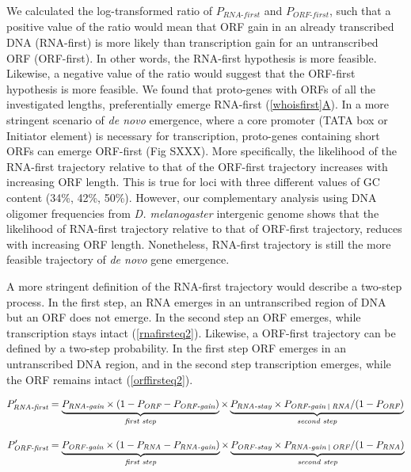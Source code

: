 \documentclass[12pt,a4paper]{article}
\newcommand{\cmnt}[1]{{\color{purple} #1}}
\begin{document}
\cmnt{We calculated the log-transformed ratio of $P_\textit{RNA-first}$ and $P_\textit{ORF-first}$, such that a positive value of the ratio would mean that ORF gain in an already transcribed DNA (RNA-first) is more likely than transcription gain for an untranscribed ORF (ORF-first). In other words, the RNA-first hypothesis is more feasible. Likewise, a negative value of the ratio would suggest that the ORF-first hypothesis is more feasible. We found that proto-genes with ORFs of all the investigated lengths, preferentially emerge RNA-first (\hyperref[whoisfirst]{\autoref{whoisfirst}A}). In a more stringent scenario of \textit{de novo} emergence, where a core promoter (TATA box or Initiator element) is necessary for transcription, proto-genes containing short ORFs can emerge ORF-first (Fig SXXX). More specifically, the likelihood of the RNA-first trajectory relative to that of the ORF-first trajectory  increases with increasing ORF length. This is true for loci with three different values of GC content (34\%, 42\%, 50\%). However, our complementary analysis using DNA oligomer frequencies from \textit{D. melanogaster} intergenic genome shows that the likelihood of RNA-first trajectory relative to that of ORF-first trajectory, reduces with increasing ORF length. Nonetheless, RNA-first trajectory is still the more feasible trajectory of \textit{de novo} gene emergence.} 

A more stringent definition of the RNA-first trajectory would describe a two-step process. In the first step, an RNA emerges in an untranscribed region of DNA but an ORF does not emerge. In the second step an ORF emerges, while transcription stays intact (\autoref{rnafirsteq2}). Likewise, a ORF-first trajectory can be defined by a two-step probability. In the first step ORF emerges in an untranscribed DNA region, and in the second step transcription emerges, while the ORF remains intact (\autoref{orffirsteq2}).

\begin{align}
P_\textit{RNA-first}' & = \underbrace{P_\textit{RNA-gain} \times (1-P_\textit{ORF} -P_\textit{ORF-gain})}_\textit{first step} \times \underbrace{P_\textit{RNA-stay}\times P_\textit{ORF-gain \vline\ RNA}/(1-P_\textit{ORF})}_\textit{second step} \label{rnafirsteq2} \\[1em]
P_\textit{ORF-first}' & = \underbrace{P_\textit{ORF-gain} \times (1-P_\textit{RNA} -P_\textit{RNA-gain})}_\textit{first step} \times \underbrace{P_\textit{ORF-stay}\times P_\textit{RNA-gain \vline\ ORF}/(1-P_\textit{RNA})}_\textit{second step} \label{orffirsteq2}
\end{align}
\end{document}
